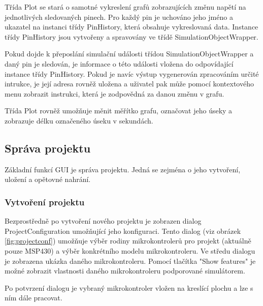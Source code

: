 Třída Plot se stará o samotné vykreslení grafů zobrazujících změnu napětí na jednotlivých sledovaných pinech. Pro každý pin je uchováno jeho jméno a ukazatel na instanci třídy PinHistory, která obsahuje vykreslovaná data. Instance třídy PinHistory jsou vytvořeny a spravovány ve třídě SimulationObjectWrapper.

Pokud dojde k přeposlání simulační události třídou SimulationObjectWrapper a daný pin je sledován, je informace o této události vložena do odpovídající instance třídy PinHistory. Pokud je navíc výstup vygenerován zpracováním určité intrukce, je její adresa rovněž uložena a uživatel pak může pomocí kontextového menu zobrazit instrukci, která je zodpovědná za danou změnu v grafu.

Třída Plot rovněž umožňuje měnit měřítko grafu, označovat jeho úseky a zobrazuje délku označeného úseku v sekundách.

\subsection{Správa projektu}

Základní funkcí GUI je správa projektu. Jedná se zejména o jeho vytvoření, uložení a opětovné nahrání.

\subsubsection{Vytvoření projektu}

Bezprostředně po vytvoření nového projektu je zobrazen dialog ProjectConfiguration umožňující jeho konfiguraci. Tento dialog (viz obrázek \ref{fig:projectconf}) umožňuje výběr rodiny mikrokontrolerů pro projekt (aktuálně pouze MSP430) a výběr konkrétního modelu mikrokontroleru. Ve středu dialogu je zobrazena ukázka daného mikrokontroleru. Pomocí tlačítka "Show features" je možné zobrazit vlastnosti daného mikrokontroleru podporované simulátorem.

Po potvrzení dialogu je vybraný mikrokontroler vložen na kreslící plochu a lze s ním dále pracovat.


